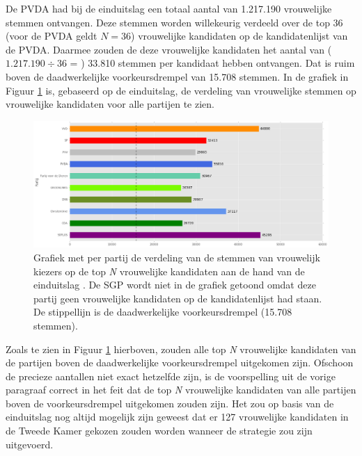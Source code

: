 De PVDA had bij de einduitslag een totaal aantal van 1.217.190 vrouwelijke stemmen ontvangen. Deze stemmen worden willekeurig verdeeld over de top 36 (voor de PVDA geldt $N=36$) vrouwelijke kandidaten op de kandidatenlijst van de PVDA. Daarmee zouden de deze vrouwelijke kandidaten het aantal van ($1.217.190\div36$ = ) 33.810 stemmen per kandidaat hebben ontvangen. Dat is ruim boven de daadwerkelijke voorkeursdrempel van 15.708 stemmen. In de grafiek in Figuur \ref{fig:stemmenV2} is, gebaseerd op de einduitslag, de verdeling van vrouwelijke stemmen op vrouwelijke kandidaten voor alle partijen te zien.

  
\begin{figure}[H]

	\includegraphics[width=\linewidth]	{stemmen_op_vrouwen_topN_uitslag.png}

			\caption{Grafiek met per partij de verdeling van de stemmen van vrouwelijk kiezers op de top \textit{N} vrouwelijke kandidaten aan de hand van de einduitslag \citep{Kiesraad_databank}. De SGP wordt niet in de grafiek getoond omdat deze partij geen vrouwelijke kandidaten op de kandidatenlijst had staan. De stippellijn is de daadwerkelijke voorkeursdrempel (15.708 stemmen).}

\label{fig:stemmenV2}
\end{figure}

Zoals te zien in Figuur \ref{fig:stemmenV2} hierboven, zouden alle top \textit{N} vrouwelijke kandidaten van de partijen boven de daadwerkelijke voorkeursdrempel uitgekomen zijn. Ofschoon de precieze aantallen niet exact hetzelfde zijn, is de voorspelling uit de vorige paragraaf correct in het feit dat de top \textit{N} vrouwelijke kandidaten van alle partijen boven de voorkeursdrempel uitgekomen zouden zijn. Het zou op basis van de einduitslag nog altijd mogelijk zijn geweest dat er 127 vrouwelijke kandidaten in de Tweede Kamer gekozen zouden worden wanneer de strategie zou zijn uitgevoerd. 

